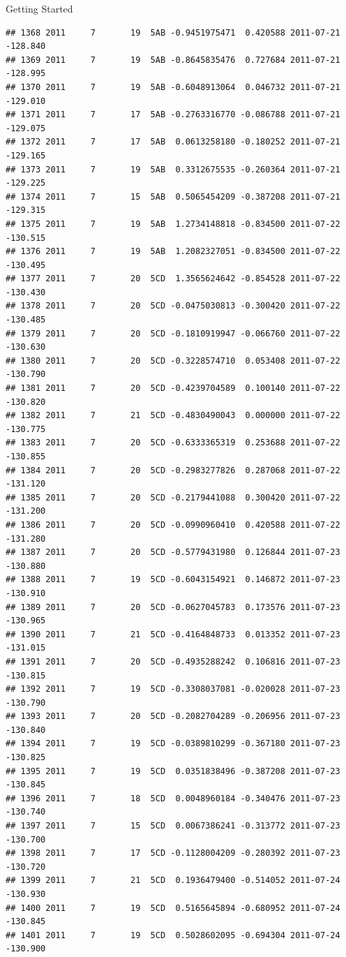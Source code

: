 \documentclass[
  ignorenonframetext,
]{beamer}
\begin{document}
\begin{frame}[fragile]{Getting Started}
\begin{verbatim}
## 1368 2011     7       19  5AB -0.9451975471  0.420588 2011-07-21 -128.840
## 1369 2011     7       19  5AB -0.8645835476  0.727684 2011-07-21 -128.995
## 1370 2011     7       19  5AB -0.6048913064  0.046732 2011-07-21 -129.010
## 1371 2011     7       17  5AB -0.2763316770 -0.086788 2011-07-21 -129.075
## 1372 2011     7       17  5AB  0.0613258180 -0.180252 2011-07-21 -129.165
## 1373 2011     7       19  5AB  0.3312675535 -0.260364 2011-07-21 -129.225
## 1374 2011     7       15  5AB  0.5065454209 -0.387208 2011-07-21 -129.315
## 1375 2011     7       19  5AB  1.2734148818 -0.834500 2011-07-22 -130.515
## 1376 2011     7       19  5AB  1.2082327051 -0.834500 2011-07-22 -130.495
## 1377 2011     7       20  5CD  1.3565624642 -0.854528 2011-07-22 -130.430
## 1378 2011     7       20  5CD -0.0475030813 -0.300420 2011-07-22 -130.485
## 1379 2011     7       20  5CD -0.1810919947 -0.066760 2011-07-22 -130.630
## 1380 2011     7       20  5CD -0.3228574710  0.053408 2011-07-22 -130.790
## 1381 2011     7       20  5CD -0.4239704589  0.100140 2011-07-22 -130.820
## 1382 2011     7       21  5CD -0.4830490043  0.000000 2011-07-22 -130.775
## 1383 2011     7       20  5CD -0.6333365319  0.253688 2011-07-22 -130.855
## 1384 2011     7       20  5CD -0.2983277826  0.287068 2011-07-22 -131.120
## 1385 2011     7       20  5CD -0.2179441088  0.300420 2011-07-22 -131.200
## 1386 2011     7       20  5CD -0.0990960410  0.420588 2011-07-22 -131.280
## 1387 2011     7       20  5CD -0.5779431980  0.126844 2011-07-23 -130.880
## 1388 2011     7       19  5CD -0.6043154921  0.146872 2011-07-23 -130.910
## 1389 2011     7       20  5CD -0.0627045783  0.173576 2011-07-23 -130.965
## 1390 2011     7       21  5CD -0.4164848733  0.013352 2011-07-23 -131.015
## 1391 2011     7       20  5CD -0.4935288242  0.106816 2011-07-23 -130.815
## 1392 2011     7       19  5CD -0.3308037081 -0.020028 2011-07-23 -130.790
## 1393 2011     7       20  5CD -0.2082704289 -0.206956 2011-07-23 -130.840
## 1394 2011     7       19  5CD -0.0389810299 -0.367180 2011-07-23 -130.825
## 1395 2011     7       19  5CD  0.0351838496 -0.387208 2011-07-23 -130.845
## 1396 2011     7       18  5CD  0.0048960184 -0.340476 2011-07-23 -130.740
## 1397 2011     7       15  5CD  0.0067386241 -0.313772 2011-07-23 -130.700
## 1398 2011     7       17  5CD -0.1128004209 -0.280392 2011-07-23 -130.720
## 1399 2011     7       21  5CD  0.1936479400 -0.514052 2011-07-24 -130.930
## 1400 2011     7       19  5CD  0.5165645894 -0.680952 2011-07-24 -130.845
## 1401 2011     7       19  5CD  0.5028602095 -0.694304 2011-07-24 -130.900

\end{verbatim}
\end{frame}
\end{document}
